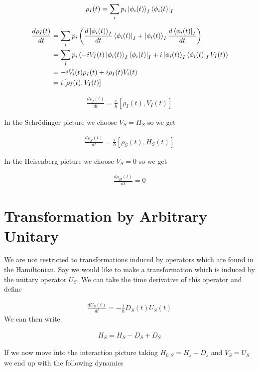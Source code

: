\documentclass[12pt]{article}
\begin{document}
\begin{align}
\rho_I(t) = \sum_i p_i \ket{\phi_i(t)}_I\bra{\phi_i(t)}_I
\end{align}

\begin{align}
\frac{d{\rho}_I(t)}{d t} &= \sum_i p_i \left(\frac{d \ket{\phi_i(t)}_I}{d t} \bra{\phi_i(t)}_I + \ket{\phi_i(t)}_I\frac{d \bra{\phi_i(t)}_I}{d t} \right)\\
&= \sum_I p_i \left(-iV_I(t) \ket{\phi_i(t)}_I\bra{\phi_i(t)}_I + i \ket{\phi_i(t)}_I\bra{\phi_i(t)}_I V_I(t) \right)\\
&= -i V_i(t) \rho_I(t) + i \rho_I(t) V_i(t)\\
&= i \left[\rho_I(t), V_I(t)\right]
\end{align}

\begin{align}
\boxed{\frac{d \rho_I(t)}{d t} = \frac{i}{\hbar} \left[\rho_I(t), V_I(t)\right]}
\end{align}

In the Schr{\"o}dinger picture we choose $V_S=H_S$ so we get

\begin{align}
\boxed{\frac{d \rho_S(t)}{d t} = \frac{i}{\hbar} \left[\rho_S(t), H_S(t)\right]}
\end{align}

In the Heisenberg picture we choose $V_S = 0$ so we get

\begin{align}
\boxed{\frac{d \rho_H(t)}{d t} = 0}
\end{align}

\section{Transformation by Arbitrary Unitary}

We are not restricted to transformations induced by operators which are found in the Hamiltonian. Say we would like to make a transformation which is induced by the unitary operator $U_S$. We can take the time derivative of this operator and define

\begin{align}
\frac{d U_S(t)}{d t} = -\frac{i}{\hbar} D_S(t) U_S(t)
\end{align} We can then write

\begin{align}
H_S = H_S - D_S + D_S
\end{align}

If we now move into the interaction picture taking $H_{0,S} = H_s - D_s$ and $V_S = U_S$ we end up with the following dynamics
\end{document}
